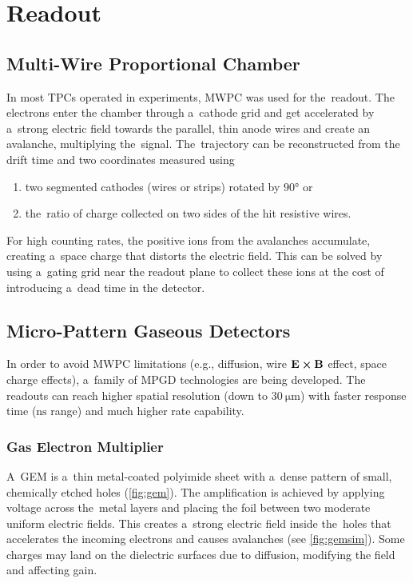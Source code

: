 	\section{Readout}
	\label{sec:readout}
		\subsection{Multi-Wire Proportional Chamber}
			In most \acp{TPC} operated in experiments, \acf{MWPC} was used for the~readout. The electrons enter the chamber through a~cathode grid and get accelerated by a~strong electric field towards the parallel, thin anode wires and create an avalanche, multiplying the~signal. The~trajectory can be reconstructed from the drift time and two coordinates measured using
			\begin{enumerate}[nosep,label=\alph*)]
				\item two segmented cathodes (wires or strips) rotated by $\ang{90}$ or
				\item the~ratio of charge collected on two sides of the hit resistive wires.
			\end{enumerate}
			For high counting rates, the positive ions from the avalanches accumulate, creating a~space charge that distorts the electric field. This can be solved by using a~gating grid near the readout plane to collect these ions at the cost of introducing a~dead time in the detector.
			
		\subsection{Micro-Pattern Gaseous Detectors}
			In order to avoid \ac{MWPC} limitations (e.g., diffusion, wire $\mathbf{E}\cross\mathbf{B}$ effect, space charge effects), a~family of \acf{MPGD} technologies are being developed. The readouts can reach higher spatial resolution (down to $\qty{30}{\um}$) with faster response time ($\unit{\ns}$ range) and much higher rate capability.
			
			\subsubsection{Gas Electron Multiplier}
				A~\acf{GEM} is a~thin metal-coated polyimide sheet with a~dense pattern of small, chemically etched holes (\cref{fig:gem}). The amplification is achieved by applying voltage across the~metal layers and placing the foil between two moderate uniform electric fields. This creates a~strong electric field inside the~holes that accelerates the incoming electrons and causes avalanches (see \cref{fig:gemsim}). Some charges may land on the dielectric surfaces due to diffusion, modifying the field and affecting gain.
				
